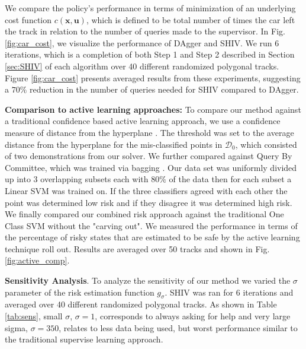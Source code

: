 \documentclass[10pt, conference]{ieeeconf}      %
\newcommand{\bu}{\mathbf{u}}
\newcommand{\bx}{\mathbf{x}}
\begin{document}
We compare the policy's performance in terms of minimization of an underlying cost function $c(\bx,\bu)$, which is
defined to be total number of times the car left the track in relation to the number of queries made to the supervisor.
In Fig. \ref{fig:car_cost}, we visualize the performance of DAgger and SHIV.  We run 6 iterations, which is a completion of both Step 1 and Step 2 described in Section \ref{sec:SHIV} of each algorithm over 40 different
randomized polygonal tracks. Figure \ref{fig:car_cost} presents averaged
results from these experiments, suggesting a $70\%$ reduction in the number of queries needed for SHIV compared to DAgger. 
 
\textbf{Comparison to active learning approaches:}
To compare our method against a traditional confidence based active learning approach, we use a confidence measure  of distance from the hyperplane \cite{tong2002support}. The threshold was set to the average distance from the hyperplane for the mis-classified points in $\mathcal{D}_0$, which consisted of two demonstrations from our solver. We further compared against Query By Committee, which was trained via bagging \cite{breiman1996bagging}. Our data set was uniformly divided up into 3 overlapping subsets each with $80\%$ of the data then for each subset a Linear SVM was trained on. If the three classifiers agreed with each other the point was determined low risk and if they disagree it was determined high risk. We finally compared our combined risk approach against the traditional One Class SVM without the "carving out". We measured the performance in terms of the percentage of risky states that  are estimated to be safe by the active learning technique roll out. Results  are averaged over 50 tracks and shown in Fig. \ref{fig:active_comp}. 

\textbf{Sensitivity Analysis}. 
To analyze the sensitivity of our method we varied the $\sigma$ parameter of the risk estimation function $g_{\sigma}$. SHIV was ran for 6 iterations and averaged over 40 different randomized polygonal tracks. As shown in Table \ref{tab:sens}, small $\sigma$, $\sigma = 1$, corresponds to always asking for help and very large sigma, $\sigma = 350$, relates to  less data being used, but worst performance similar to the traditional supervise learning approach. 
\end{document}
